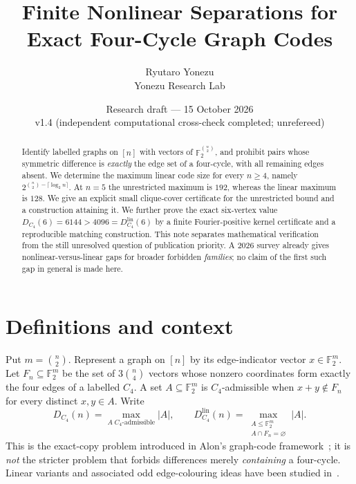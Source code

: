 \documentclass[11pt,a4paper]{article}
\title{Finite Nonlinear Separations for Exact Four-Cycle Graph Codes}
\author{Ryutaro Yonezu\\\small Yonezu Research Lab}
\date{Research draft --- 15 October 2026\\\small v1.4 (independent computational cross-check completed; unrefereed)}
\newcommand{\F}{\mathbb{F}}
\begin{document}
\maketitle
\begin{abstract}
Identify labelled graphs on $[n]$ with vectors of $\F_2^{\binom{n}{2}}$, and prohibit pairs whose symmetric difference is \emph{exactly} the edge set of a four-cycle, with all remaining edges absent. We determine the maximum linear code size for every $n\ge4$, namely $2^{\binom n2-\lceil\log_2 n\rceil}$. At $n=5$ the unrestricted maximum is $192$, whereas the linear maximum is $128$. We give an explicit small clique-cover certificate for the unrestricted bound and a construction attaining it. We further prove the exact six-vertex value $D_{C_4}(6)=6144>4096=D^{\mathrm{lin}}_{C_4}(6)$ by a finite Fourier-positive kernel certificate and a reproducible matching construction. This note separates mathematical verification from the still unresolved question of publication priority. A 2026 survey already gives nonlinear-versus-linear gaps for broader forbidden \emph{families}; no claim of the first such gap in general is made here.
\end{abstract}

\section{Definitions and context}
Put $m=\binom n2$. Represent a graph on $[n]$ by its edge-indicator vector $x\in\F_2^m$. Let $F_n\subseteq\F_2^m$ be the set of $3\binom n4$ vectors whose nonzero coordinates form exactly the four edges of a labelled $C_4$. A set $A\subseteq\F_2^m$ is $C_4$-admissible when $x+y\notin F_n$ for every distinct $x,y\in A$. Write
\[
D_{C_4}(n)=\max_{A\;C_4\text{-admissible}}|A|,
\qquad D_{C_4}^{\mathrm{lin}}(n)=\max_{\substack{A\le\F_2^m\\ A\cap F_n=\varnothing}}|A|.
\]
This is the exact-copy problem introduced in Alon's graph-code framework~\cite{Alon2024}; it is \emph{not} the stricter problem that forbids differences merely \emph{containing} a four-cycle. Linear variants and associated odd edge-colouring ideas have been studied in~\cite{Versteegen2025,Bennett2023}.
\end{document}

